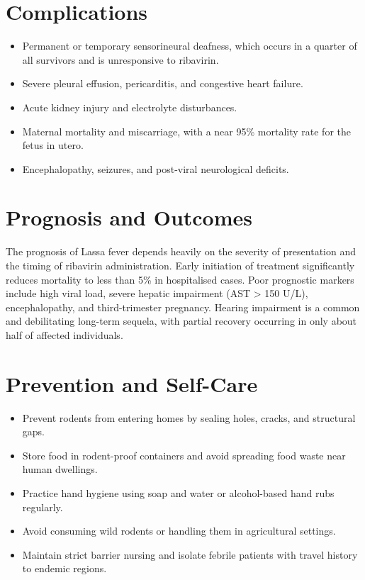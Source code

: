 \section*{Complications}
\begin{itemize}
    \item Permanent or temporary sensorineural deafness, which occurs in a quarter of all survivors and is unresponsive to ribavirin.
    \item Severe pleural effusion, pericarditis, and congestive heart failure.
    \item Acute kidney injury and electrolyte disturbances.
    \item Maternal mortality and miscarriage, with a near 95\% mortality rate for the fetus in utero.
    \item Encephalopathy, seizures, and post-viral neurological deficits.
\end{itemize}

\section*{Prognosis and Outcomes}
The prognosis of Lassa fever depends heavily on the severity of presentation and the timing of ribavirin administration. Early initiation of treatment significantly reduces mortality to less than 5\% in hospitalised cases. Poor prognostic markers include high viral load, severe hepatic impairment (AST > 150 U/L), encephalopathy, and third-trimester pregnancy. Hearing impairment is a common and debilitating long-term sequela, with partial recovery occurring in only about half of affected individuals.

\section*{Prevention and Self-Care}
\begin{itemize}
    \item Prevent rodents from entering homes by sealing holes, cracks, and structural gaps.
    \item Store food in rodent-proof containers and avoid spreading food waste near human dwellings.
    \item Practice hand hygiene using soap and water or alcohol-based hand rubs regularly.
    \item Avoid consuming wild rodents or handling them in agricultural settings.
    \item Maintain strict barrier nursing and isolate febrile patients with travel history to endemic regions.
\end{itemize}

